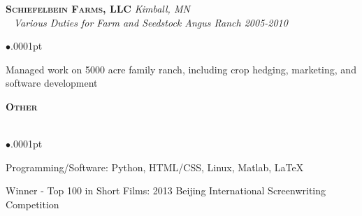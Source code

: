 \documentclass[11pt]{article}
\newcommand{\lineunder}{\vspace*{-8pt} \\ \hspace*{-18pt} \hrulefill \\}
\newcommand{\header}[1]{{\hspace*{-15pt}\vspace*{5pt} \Large \textsc{\textbf{#1}}} \vspace*{-6pt} \lineunder \vspace*{0pt} }
\newcommand{\employer}[4]{{\hspace*{-20pt} {\small{\textbf{\textsc{ #1}}}} \hfill \small{\emph{#2}}\\ ~\hspace*{-20pt} \small \emph{ #3 \hfill #4}}\\ }
\newenvironment{achievements}{\begin{list}{$\bullet$}{\topsep .0001pt \itemsep -2pt}}{\vspace*{5pt}\end{list} }
\begin{document}


\employer{Schiefelbein Farms, LLC } {Kimball, MN} {Various Duties for Farm and Seedstock Angus Ranch} {2005-2010}\nopagebreak[4]
	\begin{achievements}
	\item 	Managed work on 5000 acre family ranch, including crop hedging, marketing, and software development
	\end{achievements}

\header{Other}
\vspace{-2pt}
\begin{achievements}
\item	Programming/Software: Python, HTML/CSS, Linux, Matlab, \LaTeX{}
\item  Winner - Top 100 in Short Films: 2013 Beijing International Screenwriting Competition




\end{achievements}
\end{document}
